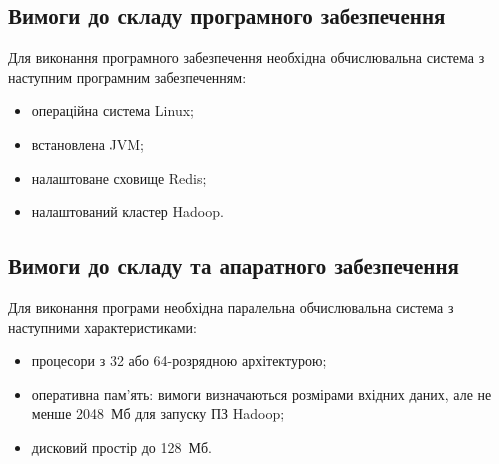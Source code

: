 \documentclass[ukrainian,utf8,pointsubsection,simple]{eskdtext}
\begin{document}
\subsection{Вимоги до складу програмного забезпечення}
Для виконання програмного забезпечення необхідна обчислювальна система з
наступним програмним забезпеченням:
\begin{itemize}
\item операційна система Linux;
\item встановлена JVM;
\item налаштоване сховище Redis;
\item налаштований кластер Hadoop.
\end{itemize}

\subsection{Вимоги до складу та апаратного забезпечення}
Для виконання програми необхідна паралельна обчислювальна система з наступними характеристиками:
\begin{itemize}
\item процесори з 32 або 64-розрядною архітектурою;
\item оперативна пам'ять: вимоги визначаються розмірами вхідних даних, але не менше 2048~Мб для запуску ПЗ Hadoop;
\item дисковий простір до 128~Мб.
\end{itemize}
\end{document}
